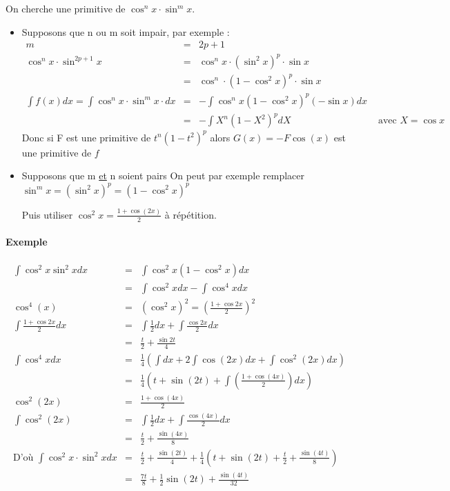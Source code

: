 On cherche une primitive de $\cos^nx \cdot \sin^m x$.

\begin{itemize}
	\item Supposons que n ou m soit impair, par exemple : \[\begin{array}{rclr}
			m&=& 2p + 1 \\
\cos^n x \cdot \sin^{2p+1}x &=& \cos^n x \cdot (\sin^2 x)^p \cdot \sin x \\
&=& \cos^n \cdot (1-\cos^2 x)^p \cdot \sin x \\
\int f(x)dx = \int \cos^n x \cdot \sin^m x \cdot dx &=& -\int \cos^n x (1-\cos^2 x)^p (-\sin x) dx \\
&=& - \int X^n (1-X^2)^p dX & \text{ avec } X = \cos x
\end{array}\]
	Donc si F est une primitive de $t^n  (1-t^2)^p$ alors $G(x) = -F \cos(x)$ est une primitive de $f$

	\item Supposons que m \ul{et} n soient pairs
	On peut par exemple remplacer $\sin^m x = (\sin^{2}x)^p = (1-\cos^2 x)^p$

	Puis utiliser $\cos^2 x = \frac{1+\cos(2x)}{2}$ à répétition.

\end{itemize}

\paragraph{Exemple}
	\[\begin{array}{rcl}
		\int \cos^2 x \sin^2 x dx &=& \int \cos^2 x (1-\cos^2 x)dx \\
&=& \int \cos^2 x dx - \int \cos^4 x dx \\
			\cos ^4(x) &=& (\cos^2 x)^2 = (\frac{1+\cos 2x}{2})^2 \\
\int \frac{1 + \cos 2 x}{2} dx &=& \int \frac{1}{2} dx + \int \frac{\cos 2x}{2}dx \\
&=& \frac{t}{2} + \frac{\sin 2t}{4} \\
\int \cos^4 x dx &=& \frac{1}{4}(\int dx + 2\int \cos(2x) dx + \int \cos^2(2x)dx) \\
&=& \frac{1}{4}(t + \sin(2t) + \int (\frac{1+\cos(4x)}{2}) dx) \\
\cos^2(2x) &=& \frac{1+\cos(4x)}{2} \\
			\int \cos^2(2x) &=& \int \frac{1}{2}dx + \int \frac{\cos(4x)}{2}dx \\
		   &=& \frac{t}{2} + \frac{\sin(4x)}{8} \\
			\text{D'où } \int \cos^2x \cdot \sin^2x dx &=& \frac{t}{2} + \frac{\sin(2t)}{4} + \frac{1}{4} (t + \sin(2t) + \frac{t}{2} + \frac{\sin(4t)}{8}) \\
	   &=& \frac{7t}{8} + \frac{1}{2}\sin(2t) + \frac{\sin(4t)}{32}
	\end{array}\]


